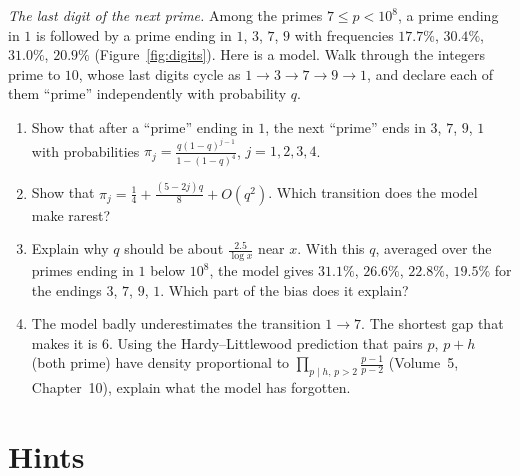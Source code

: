 \begin{exercise}[$\star\star$]\label{pb:digitpairs}
\emph{The last digit of the next prime.} Among the primes $7\le p<10^8$, a prime ending in $1$ is followed by a prime ending in $1$, $3$, $7$, $9$ with frequencies
$17.7\%$, $30.4\%$, $31.0\%$, $20.9\%$ (Figure~\ref{fig:digits}). Here is a model. Walk through the integers prime to $10$, whose last digits cycle as
$1\to3\to7\to9\to1$, and declare each of them ``prime'' independently with probability $q$.
\begin{enumerate}[label=(\alph*)]
\item Show that after a ``prime'' ending in $1$, the next ``prime'' ends in $3$, $7$, $9$, $1$ with probabilities $\pi_j=\frac{q(1-q)^{j-1}}{1-(1-q)^4}$, $j=1,2,3,4$.
\item Show that $\pi_j=\frac14+\frac{(5-2j)q}8+O(q^2)$. Which transition does the model make rarest?
\item Explain why $q$ should be about $\frac{2.5}{\log x}$ near $x$. With this $q$, averaged over the primes ending in $1$ below $10^8$, the model gives $31.1\%$, $26.6\%$, $22.8\%$, $19.5\%$
for the endings $3$, $7$, $9$, $1$. Which part of the bias does it explain?
\item The model badly underestimates the transition $1\to7$. The shortest gap that makes it is $6$. Using the Hardy--Littlewood prediction that pairs $p$, $p+h$ (both prime) have
density proportional to $\prod_{p\mid h,\,p>2}\frac{p-1}{p-2}$ (Volume~5, Chapter~10), explain what the model has forgotten.
\end{enumerate}
\end{exercise}

\section{Hints}

